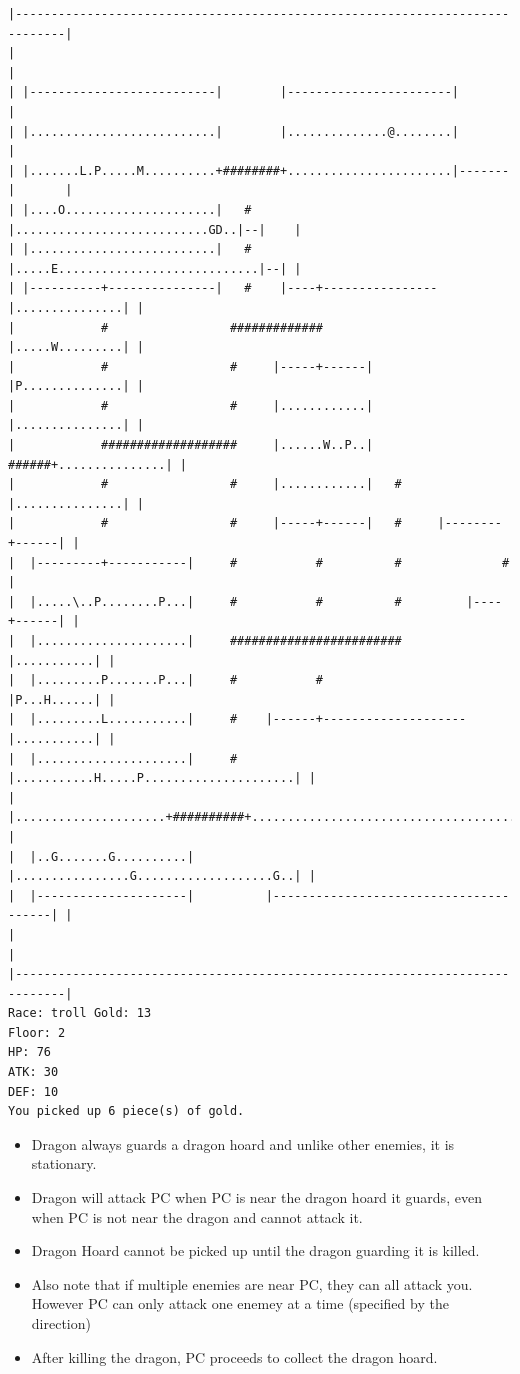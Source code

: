\documentclass[11pt]{article}
\theoremstyle{plain}
\begin{document}
\begin{Verbatim}[fontsize=\scriptsize]
|-----------------------------------------------------------------------------|
|                                                                             |
| |--------------------------|        |-----------------------|               |
| |..........................|        |..............@........|               |
| |.......L.P.....M..........+########+.......................|-------|       |
| |....O.....................|   #    |...........................GD..|--|    |
| |..........................|   #    |.....E............................|--| |
| |----------+---------------|   #    |----+----------------|...............| |
|            #                 #############                |.....W.........| |
|            #                 #     |-----+------|         |P..............| |
|            #                 #     |............|         |...............| |
|            ###################     |......W..P..|   ######+...............| |
|            #                 #     |............|   #     |...............| |
|            #                 #     |-----+------|   #     |--------+------| |
|  |---------+-----------|     #           #          #              #        |
|  |.....\..P........P...|     #           #          #         |----+------| |
|  |.....................|     ########################         |...........| |
|  |.........P.......P...|     #           #                    |P...H......| |
|  |.........L...........|     #    |------+--------------------|...........| |
|  |.....................|     #    |...........H.....P.....................| |
|  |.....................+##########+.......................................| |
|  |..G.......G..........|          |................G...................G..| |
|  |---------------------|          |---------------------------------------| |
|                                                                             |
|-----------------------------------------------------------------------------|
Race: troll Gold: 13                                                   Floor: 2
HP: 76
ATK: 30
DEF: 10
You picked up 6 piece(s) of gold. 
\end{Verbatim}


\begin{itemize}
    \item Dragon always guards a dragon hoard and unlike other enemies, it is stationary.
    \item Dragon will attack PC when PC is near the dragon hoard it guards, even when PC
    is not near the dragon and cannot attack it.
    \item Dragon Hoard cannot be picked up until the dragon guarding it is killed.
    \item Also note that if multiple enemies are near PC, they can all attack you. However
    PC can only attack one enemey at a time (specified by the direction)
    \item After killing the dragon, PC proceeds to collect the dragon hoard.
\end{itemize}
\end{document}
